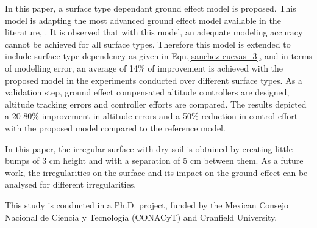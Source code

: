 \documentclass[twocolumn,10pt]{asme2ej}
\begin{document}
In this paper, a surface type dependant ground effect model is proposed. This model is adapting the most advanced ground effect model available in the literature, \cite{Sanchez-Cuevas2017}. It is observed that with this model, an adequate modeling accuracy cannot be achieved for all surface types. Therefore this model is extended to include surface type dependency as given in Eqn.\eqref{sanchez-cuevas_3}, and in terms of modelling error, an average of 14\% of improvement is achieved with the proposed model in the experiments conducted over different surface types. As a validation step, ground effect compensated altitude controllers are designed, altitude tracking errors and controller efforts are compared. The results depicted a 20-80\% improvement in altitude errors and a 50\% reduction in control effort with the proposed model compared to the reference model.

In this paper, the irregular surface with dry soil is obtained by creating little bumps of 3 cm height and with a separation of 5 cm between them. As a future work, the irregularities on the surface and its impact on the ground effect can be analysed for different irregularities.



\begin{acknowledgment}
    This study is conducted in a Ph.D. project, funded by the Mexican Consejo Nacional de Ciencia y Tecnología (CONACyT) and Cranfield University.
\end{acknowledgment}
\end{document}
